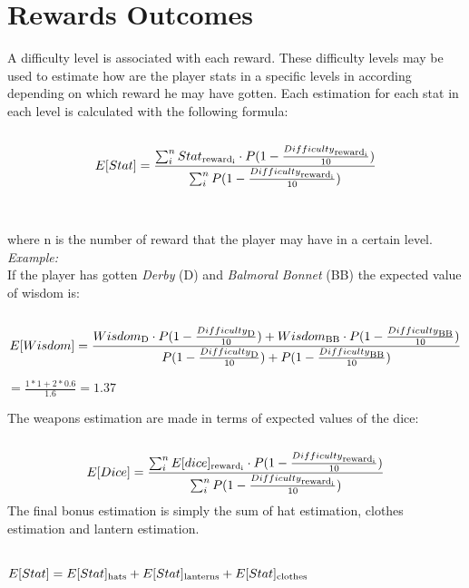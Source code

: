 \section{Rewards Outcomes}
A difficulty level is associated with each reward. These difficulty levels may be used to estimate how are the player stats in a specific levels in according depending on which reward he may have gotten. Each estimation for each stat in each level is calculated with the following formula: \\\\
\begin{equation}
  E[Stat]= \frac{\sum_{i}^{n} Stat\textsubscript{reward\textsubscript{i}}
  \cdot
  P(1-\frac{Difficulty\textsubscript{reward\textsubscript{i}}}{10})}
  {\sum_{i}^{n}P(1-\frac{Difficulty\textsubscript{reward\textsubscript{i}}}{10})}
\end{equation}
\\\\
where n is the number of reward that the player may have in a certain level.\\
\textit{Example:}\\
If the player has gotten \textit{Derby} (D) and \textit{Balmoral Bonnet} (BB) the expected value of wisdom is:\\\\
\begin{equation}
E[Wisdom]= \frac{Wisdom\textsubscript{D} \cdot P(1-\frac{Difficulty\textsubscript{D}}{10}) +
  Wisdom\textsubscript{BB} \cdot P(1-\frac{Difficulty\textsubscript{BB}}{10})}
{P(1-\frac{Difficulty\textsubscript{D}}{10})+P(1-\frac{Difficulty\textsubscript{BB}}{10})} 
\end{equation}
\begin{center}
  $= \frac{1*1 + 2*0.6}{1.6} =1.37$
  \end{center}

The weapons estimation are made in terms of expected values of the dice:\\\\
\begin{equation}
  E[Dice]= \frac{\sum_{i}^{n} E[dice]\textsubscript{reward\textsubscript{i}}
  \cdot
  P(1-\frac{Difficulty\textsubscript{reward\textsubscript{i}}}{10})}
  {\sum_{i}^{n}P(1-\frac{Difficulty\textsubscript{reward\textsubscript{i}}}{10})}
\end{equation}
The final bonus estimation is simply the sum of hat estimation, clothes estimation and lantern estimation.\\\\
\begin{center}
  $E[Stat]=E[Stat]\textsubscript{hats} + E[Stat]\textsubscript{lanterns} + E[Stat]\textsubscript{clothes}$
  \end{center}

